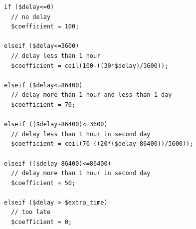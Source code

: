 \begin{itemize}
         \begin{lstlisting}[basicstyle=\ttfamily, frame=single,
    columns=fullflexible, breaklines=true, numbers=none]
if ($delay<=0)
  // no delay
  $coefficient = 100;

elseif ($delay<=3600)
  // delay less than 1 hour
  $coefficient = ceil(100-((30*$delay)/3600));

elseif ($delay<=86400)
  // delay more than 1 hour and less than 1 day
  $coefficient = 70;

elseif (($delay-86400)<=3600)
  // delay less than 1 hour in second day
  $coefficient = ceil(70-((20*($delay-86400))/3600));

elseif (($delay-86400)<=86400)
  // delay more than 1 hour in second day
  $coefficient = 50;

elseif ($delay > $extra_time)
  // too late
  $coefficient = 0;
    \end{lstlisting}


\end{itemize}
